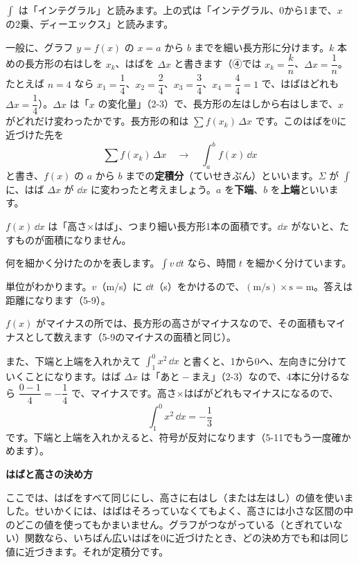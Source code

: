 $\int$ は「インテグラル」と読みます。上の式は「インテグラル、0から1まで、$x$ の2乗、ディーエックス」と読みます。

一般に、グラフ $y=f(x)$ の $x=a$ から $b$ までを細い長方形に分けます。$k$ 本めの長方形の右はしを $x_k$、はばを $\Delta x$ と書きます（④では $x_k=\dfrac{k}{n}$、$\Delta x=\dfrac{1}{n}$。たとえば $n=4$ なら $x_1=\dfrac{1}{4}$、$x_2=\dfrac{2}{4}$、$x_3=\dfrac{3}{4}$、$x_4=\dfrac{4}{4}=1$ で、はばはどれも $\Delta x=\dfrac{1}{4}$）。$\Delta x$ は「$x$ の変化量」（2-3）で、長方形の左はしから右はしまで、$x$ がどれだけ変わったかです。長方形の和は $\sum f(x_k)\,\Delta x$ です。このはばを0に近づけた先を
\[ \sum f(x_k)\,\Delta x\quad\longrightarrow\quad\int_a^b f(x)\,\dd x \]
と書き、$f(x)$ の $a$ から $b$ までの\textbf{定積分}（ていせきぶん）といいます。$\Sigma$ が $\int$ に、はば $\Delta x$ が $\dd x$ に変わったと考えましょう。$a$ を\textbf{下端}、$b$ を\textbf{上端}といいます。

\par
\begin{enumerate}[label={\bkcircled[bkTheme]{\arabic*}}, leftmargin=2.4\zw, itemsep=1pt, topsep=2pt]
\item $f(x)\,\dd x$ は「高さ×はば」、つまり細い長方形1本の面積です。$\dd x$ がないと、たすものが面積になりません。
\item 何を細かく分けたのかを表します。$\displaystyle\int v\,\dd t$ なら、時間 $t$ を細かく分けています。
\item 単位がわかります。$v$（m/s）に $\dd t$（s）をかけるので、$(\text{m/s})\times\text{s}=\text{m}$。答えは距離になります（5-9）。
\end{enumerate}

\par
$f(x)$ がマイナスの所では、長方形の高さがマイナスなので、その面積もマイナスとして数えます（5-9のマイナスの面積と同じ）。

また、下端と上端を入れかえて $\displaystyle\int_1^0 x^2\,\dd x$ と書くと、1から0へ、左向きに分けていくことになります。はば $\Delta x$ は「あと${}-{}$まえ」（2-3）なので、4本に分けるなら $\dfrac{0-1}{4}=-\dfrac{1}{4}$ で、マイナスです。高さ×はばがどれもマイナスになるので、
\[ \int_1^0 x^2\,\dd x=-\frac{1}{3} \]
です。下端と上端を入れかえると、符号が反対になります（5-11でもう一度確かめます）。

\begin{seikaku}
\noindent\textbf{はばと高さの決め方}\par
ここでは、はばをすべて同じにし、高さに右はし（または左はし）の値を使いました。せいかくには、はばはそろっていなくてもよく、高さには小さな区間の中のどこの値を使ってもかまいません。グラフがつながっている（とぎれていない）関数なら、いちばん広いはばを0に近づけたとき、どの決め方でも和は同じ値に近づきます。それが定積分です。
\end{seikaku}

